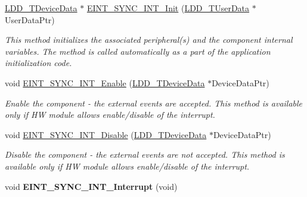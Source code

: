 \begin{DoxyCompactItemize}
\item 
\hyperlink{group___p_e___types__module_gac5cf1362f1f0e3a2ce71b1bf2276d091}{L\-D\-D\-\_\-\-T\-Device\-Data} $\ast$ \hyperlink{group___e_i_n_t___s_y_n_c___i_n_t__module_ga147d2662135bdc1fb7f7478a421933a4}{E\-I\-N\-T\-\_\-\-S\-Y\-N\-C\-\_\-\-I\-N\-T\-\_\-\-Init} (\hyperlink{group___p_e___types__module_ga0b66a73f87238a782318aa0be7578e35}{L\-D\-D\-\_\-\-T\-User\-Data} $\ast$User\-Data\-Ptr)
\begin{DoxyCompactList}\small\item\em This method initializes the associated peripheral(s) and the component internal variables. The method is called automatically as a part of the application initialization code. \end{DoxyCompactList}\item 
void \hyperlink{group___e_i_n_t___s_y_n_c___i_n_t__module_ga4f53d72cded9bef1cf324a2092bdc661}{E\-I\-N\-T\-\_\-\-S\-Y\-N\-C\-\_\-\-I\-N\-T\-\_\-\-Enable} (\hyperlink{group___p_e___types__module_gac5cf1362f1f0e3a2ce71b1bf2276d091}{L\-D\-D\-\_\-\-T\-Device\-Data} $\ast$Device\-Data\-Ptr)
\begin{DoxyCompactList}\small\item\em Enable the component -\/ the external events are accepted. This method is available only if H\-W module allows enable/disable of the interrupt. \end{DoxyCompactList}\item 
void \hyperlink{group___e_i_n_t___s_y_n_c___i_n_t__module_ga436aa71d065e7db366bafdeb4f3ba1a4}{E\-I\-N\-T\-\_\-\-S\-Y\-N\-C\-\_\-\-I\-N\-T\-\_\-\-Disable} (\hyperlink{group___p_e___types__module_gac5cf1362f1f0e3a2ce71b1bf2276d091}{L\-D\-D\-\_\-\-T\-Device\-Data} $\ast$Device\-Data\-Ptr)
\begin{DoxyCompactList}\small\item\em Disable the component -\/ the external events are not accepted. This method is available only if H\-W module allows enable/disable of the interrupt. \end{DoxyCompactList}\item 
\hypertarget{group___e_i_n_t___s_y_n_c___i_n_t__module_ga8be5d304b56041b9d3a808782dc4ae71}{void {\bfseries E\-I\-N\-T\-\_\-\-S\-Y\-N\-C\-\_\-\-I\-N\-T\-\_\-\-Interrupt} (void)}\label{group___e_i_n_t___s_y_n_c___i_n_t__module_ga8be5d304b56041b9d3a808782dc4ae71}

\end{DoxyCompactItemize}


